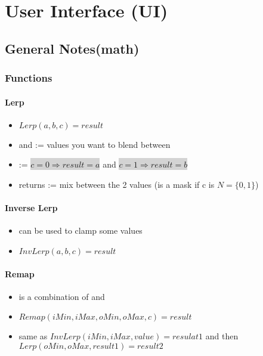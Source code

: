 \chapter{User Interface (UI)}
    \section{General Notes(math)}
            \subsection{Functions}
                \subsubsection{Lerp}
                    \begin{itemize}
                        \item $Lerp(a, b, c) = result$
                        \item {} and  := values you want to blend between
                        \item {} :=  \colorbox{lightgray}{$c = 0 \Rightarrow result = a$} and \colorbox{lightgray}{$c = 1 \Rightarrow result = b$}
                        \item returns := mix between the 2 values (is a mask if c is  ${N}=\{0,1\}$)
                    \end{itemize}

                \subsubsection{Inverse Lerp}
                    \begin{itemize}
                        \item can be used to clamp some values
                        \item $InvLerp(a, b, c) = result$
                    \end{itemize}


                \subsubsection{Remap}
                    \begin{itemize}
                        \item is a combination of  and 
                        \item $Remap(iMin, iMax, oMin, oMax, c) = result$
                        \item same as $InvLerp(iMin, iMax, value) = resulat1$ and then $Lerp(oMin, oMax, result1) = result2$
                    \end{itemize}


